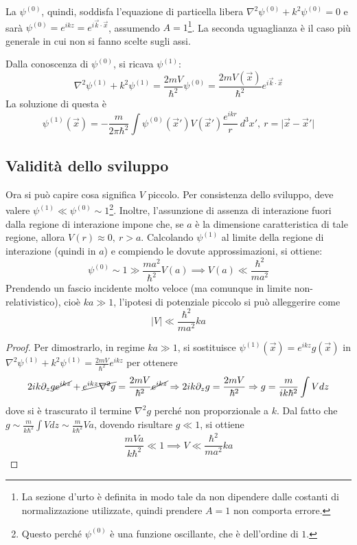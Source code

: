 \documentclass[11pt, a4paper]{scrartcl} %
\numberwithin{equation}{subsection}
\theoremstyle{style2}
\theoremstyle{style1}
\begin{document}
La $\psi ^{(0)} $, quindi, soddisfa l'equazione di particella libera $\nabla ^2 \psi ^{(0)} + k^2 \psi ^{(0)} =0$ e sar\`a $\psi ^{(0)}  =  e^{ikz}  = e^{i \vec{k}\cdot \vec{x}}$, assumendo $A = 1$\footnote{La sezione d'urto \`e definita in modo tale da non dipendere dalle costanti di normalizzazione utilizzate, quindi prendere $A=1$ non comporta errore.}. 
La seconda uguaglianza \`e il caso pi\`u generale in cui non si fanno scelte sugli assi.

Dalla conoscenza di $\psi ^{(0)} $, si ricava $\psi ^{(1)} $:
\[
\nabla ^2 \psi ^{(1)} + k^2 \psi ^{(1)} = \frac{2mV}{\hbar ^2}\psi ^{(0)} = \frac{2mV(\vec{x})}{\hbar ^2} e^{i \vec{k}\cdot \vec{x}} 
\] 
La soluzione di questa \`e
\[
\psi ^{(1)} (\vec{x}) = - \frac{m}{2\pi \hbar ^2}\int \psi ^{(0)} (\vec{x}') V(\vec{x}') \frac{e^{ikr}}{r} \ d^3 x', \ r = \lvert \vec{x}-\vec{x}' \rvert 
\] 
\subsection{Validit\`a dello sviluppo}

Ora si pu\`o capire cosa significa $V$ piccolo. 
Per consistenza dello sviluppo, deve valere $\psi ^{(1)} \ll\psi ^{(0)} \sim 1$\footnote{Questo perch\'e $\psi ^{(0)} $ \`e una funzione oscillante, che \`e dell'ordine di $1$.}.
Inoltre, l'assunzione di assenza di interazione fuori dalla regione di interazione impone che, se $a$ \`e la dimensione caratteristica di tale regione, allora $V(r) \approx 0, \ r > a$.
Calcolando $\psi ^{(1)}  $ al limite della regione di interazione (quindi in $a$) e compiendo le dovute approssimazioni, si ottiene:
\[
\psi ^{(0)} \sim 1 \gg \frac{m a^2}{ \hbar ^2} V(a) \implies V(a) \ll \frac{ \hbar ^2}{m a^2}
\] 
Prendendo un fascio incidente molto veloce (ma comunque in limite non-relativistico), cio\`e $ka \gg 1$, l'ipotesi di potenziale piccolo si pu\`o alleggerire come
\begin{equation}
	\lvert V \rvert  \ll \frac{\hbar ^2}{ma^2} ka
\end{equation}
\begin{proof}
	Per dimostrarlo, in regime $ka \gg 1$, si sostituisce $\psi ^{(1)} (\vec{x}) = e^{ikz} g(\vec{x})$ in $\nabla ^2 \psi ^{(1)} + k^2 \psi ^{(1)} = \frac{2mV}{\hbar ^2} e^{ikz} $ per ottenere
	\[
		2ik \partial _z g \cancel{e^{ikz}} + \cancel{e^{ikz} \nabla ^2 g } = \frac{2mV}{\hbar ^2}\cancel{e^{ikz} } \Rightarrow 2ik \partial _z g = \frac{2mV}{\hbar ^2}\Rightarrow g = \frac{m}{ik\hbar ^2}\int V dz
	\] 
dove si \`e trascurato il termine $\nabla ^2 g$ perch\'e non proporzionale a $k$.	
Dal fatto che $g \sim \frac{m}{k\hbar ^2} \int V dz \sim \frac{m}{k\hbar ^2}Va$, dovendo risultare $g\ll 1$, si ottiene 
\[
\frac{mVa}{k\hbar ^2}\ll 1 \implies V \ll \frac{\hbar ^2}{ma^2}ka
\] 

\end{proof}
\end{document}
